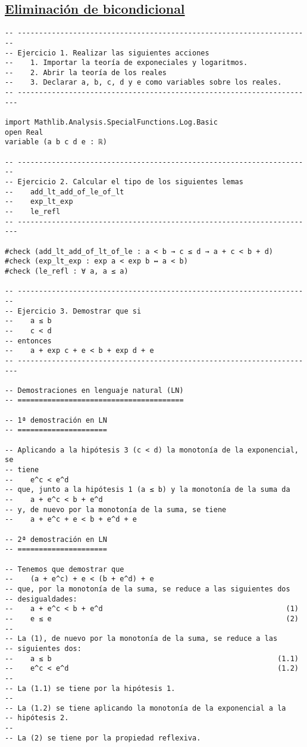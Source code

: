 \subsection{\href{./src/Basicos/Eliminacion\_de\_bicondicional.lean}{Eliminación de bicondicional}}
\label{sec:org115268e}
\begin{verbatim}
-- ---------------------------------------------------------------------
-- Ejercicio 1. Realizar las siguientes acciones
--    1. Importar la teoría de exponeciales y logaritmos.
--    2. Abrir la teoría de los reales
--    3. Declarar a, b, c, d y e como variables sobre los reales.
-- ----------------------------------------------------------------------

import Mathlib.Analysis.SpecialFunctions.Log.Basic
open Real
variable (a b c d e : ℝ)

-- ---------------------------------------------------------------------
-- Ejercicio 2. Calcular el tipo de los siguientes lemas
--    add_lt_add_of_le_of_lt
--    exp_lt_exp
--    le_refl
-- ----------------------------------------------------------------------

#check (add_lt_add_of_lt_of_le : a < b → c ≤ d → a + c < b + d)
#check (exp_lt_exp : exp a < exp b ↔ a < b)
#check (le_refl : ∀ a, a ≤ a)

-- ---------------------------------------------------------------------
-- Ejercicio 3. Demostrar que si
--    a ≤ b
--    c < d
-- entonces
--    a + exp c + e < b + exp d + e
-- ----------------------------------------------------------------------

-- Demostraciones en lenguaje natural (LN)
-- =======================================

-- 1ª demostración en LN
-- =====================

-- Aplicando a la hipótesis 3 (c < d) la monotonía de la exponencial, se
-- tiene
--    e^c < e^d
-- que, junto a la hipótesis 1 (a ≤ b) y la monotonía de la suma da
--    a + e^c < b + e^d
-- y, de nuevo por la monotonía de la suma, se tiene
--    a + e^c + e < b + e^d + e

-- 2ª demostración en LN
-- =====================

-- Tenemos que demostrar que
--    (a + e^c) + e < (b + e^d) + e
-- que, por la monotonía de la suma, se reduce a las siguientes dos
-- desigualdades:
--    a + e^c < b + e^d                                           (1)
--    e ≤ e                                                       (2)
--
-- La (1), de nuevo por la monotonía de la suma, se reduce a las
-- siguientes dos:
--    a ≤ b                                                     (1.1)
--    e^c < e^d                                                 (1.2)
--
-- La (1.1) se tiene por la hipótesis 1.
--
-- La (1.2) se tiene aplicando la monotonía de la exponencial a la
-- hipótesis 2.
--
-- La (2) se tiene por la propiedad reflexiva.


\end{verbatim}
